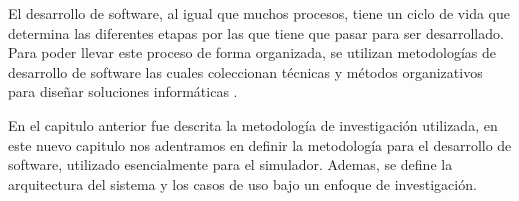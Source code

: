 El desarrollo de software, al igual que muchos procesos, tiene un ciclo de vida que determina las diferentes etapas por las que tiene que pasar para ser desarrollado. Para poder llevar este proceso de forma organizada, se utilizan metodologías de desarrollo de software las cuales coleccionan técnicas y métodos organizativos para diseñar soluciones informáticas \cite{software_1}.

En el capitulo anterior fue descrita la metodología de investigación utilizada, en este nuevo capitulo nos adentramos en definir la metodología para el desarrollo de software, utilizado esencialmente para el simulador. Ademas, se define la arquitectura del sistema y los casos de uso bajo un enfoque de investigación.



  